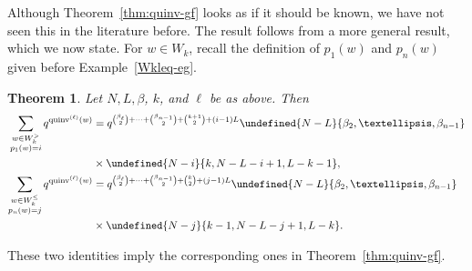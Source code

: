 \documentclass[11pt]{article}
\newtheorem{theorem}[theo]{Theorem}
\theoremstyle{definition}
\providecommand{\qbinom}[2]{\genfrac{[}{]}{0pt}{}{#1}{#2}}
\numberwithin{equation}{section}
\DeclareMathOperator{\quinvL}{\quinv^{(\ell)}}
\DeclareMathOperator{\quinv}{quinv}
\let\qbinom\undefined
\newcommand{\qbinom}[2]{\bgroup\renewcommand*{\arraystretch}{1}\begin{bmatrix} #1 \\ #2\end{bmatrix} \egroup}
\begin{document}
Although Theorem~\ref{thm:quinv-gf} looks as if it should be known, we have not seen this in the literature before. The result follows from a more general result, which we now state. 
For $w \in W_k$, recall the definition of $p_1(w)$ and $p_n(w)$ given before Example~\ref{Wkleq-eg}.

\begin{theorem}
\label{thm:quinv-refined-gf}
Let $N, L, \beta$, $k$, and $\ell$ be as above. 
Then
\begin{align}
\label{quinv-ref-gf>}
\sum_{\substack{ w \in W_k^> \\ p_1(w) = i}} q^{\quinvL(w)} &= q^{\binom{\beta_\ell}{2} + \cdots + \binom{\beta_{n-1}}{2} + \binom{k+1}{2} + (i-1)L} 
\qbinom{N-L}{\beta_2,\dots,\beta_{n-1}} \cr 
& \times \qbinom{N-i}{k, N-L-i+1, L-k-1}, \\
\label{quinv-ref-gf<}
\sum_{\substack{ w \in W_k^\leq \\ p_n(w) = j}} q^{\quinvL(w)} &= q^{\binom{\beta_\ell}{2} + \cdots + \binom{\beta_{n-1}}{2}+\binom{k}{2} + (j-1) L} 
\qbinom{N-L}{\beta_2,\dots,\beta_{n-1}} \cr 
& \times \qbinom{N-j}{k-1, N-L-j+1, L-k}.
\end{align} \end{theorem}

These two identities imply the corresponding ones in Theorem~\ref{thm:quinv-gf}.
\end{document}
